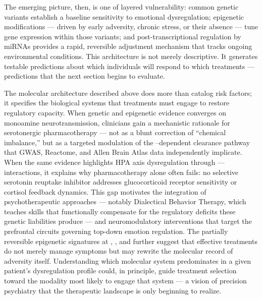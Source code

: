 The emerging picture, then, is one of layered vulnerability: common genetic
variants establish a baseline sensitivity to emotional dysregulation; epigenetic
modifications — driven by early adversity, chronic stress, or their absence —
tune gene expression within those variants; and post-transcriptional regulation
by miRNAs provides a rapid, reversible adjustment mechanism that tracks ongoing
environmental conditions.
This architecture is not merely descriptive.
It generates testable predictions about which individuals will respond to which
treatments — predictions that the next section begins to evaluate.



\bigskip

The molecular architecture described above does more than catalog risk factors;
it specifies the biological systems that treatments must engage to restore
regulatory capacity.
When genetic and epigenetic evidence converges on monoamine neurotransmission,
clinicians gain a mechanistic rationale for serotonergic pharmacotherapy — not
as a blunt correction of ``chemical imbalance,'' but as a targeted modulation
of the --dependent clearance pathway that GWAS, Reactome, and
Allen Brain Atlas data independently implicate.
When the same evidence highlights HPA axis dysregulation through
---- interactions, it explains why
pharmacotherapy alone often fails: no selective serotonin reuptake inhibitor
addresses glucocorticoid receptor sensitivity or cortisol feedback dynamics.
This gap motivates the integration of psychotherapeutic approaches — notably
Dialectical Behavior Therapy, which teaches skills that functionally compensate
for the regulatory deficits these genetic liabilities produce — and
neuromodulatory interventions that target the prefrontal circuits governing
top-down emotion regulation.
The partially reversible epigenetic signatures at , ,
and  further suggest that effective treatments do not merely manage
symptoms but may rewrite the molecular record of adversity itself.
Understanding which molecular system predominates in a given patient's
dysregulation profile could, in principle, guide treatment selection toward the
modality most likely to engage that system — a vision of precision psychiatry
that the therapeutic landscape is only beginning to realize.



